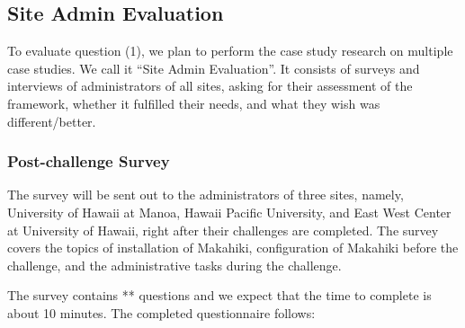 \documentclass[11pt]{article}
\begin{document}
\subsection{Site Admin Evaluation}
To evaluate question (1), we plan to perform the case study research on multiple case studies. We call it ``Site Admin Evaluation''. It consists of surveys and interviews of administrators of all sites, asking for their assessment of the framework, whether it fulfilled their needs, and what they wish was different/better.

\subsubsection{Post-challenge Survey}
The survey will be sent out to the administrators of three sites, namely, University of Hawaii at Manoa, Hawaii Pacific University, and East West Center at University of Hawaii, right after their challenges are completed. The survey covers the topics of installation of Makahiki, configuration of Makahiki before the challenge, and the administrative tasks during the challenge. 

The survey contains ** questions and we expect that the time to complete is about 10 minutes. The completed questionnaire follows:
\end{document}
